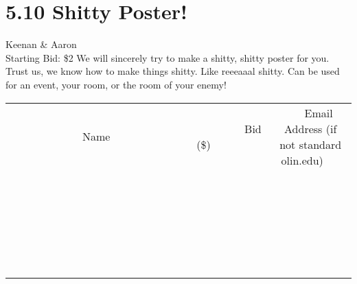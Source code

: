\documentclass[11pt]{article}
\begin{document}
\section*{5.10 Shitty Poster!}
Keenan \& Aaron
\\
Starting Bid: \$2
\newline
We will sincerely try to make a shitty, shitty poster for you. Trust us, we know how to make things shitty. Like reeeaaal shitty. Can be used for an event, your room, or the room of your enemy!
\\[6ex]
\begin{tabular}{c c c}
~~~~~~~~~~~~~Name~~~~~~~~~~~~~ & ~~~~~~~~~Bid (\$)~~~~~~~~~  & ~~~Email Address (if not standard olin.edu)~~~\\
 & & \\
\hline
 & & \\
\hline
 & & \\
\hline
 & & \\
\hline
 & & \\
\hline
 & & \\
\hline
 & & \\
\hline
 & & \\
\hline
 & & \\
\hline
 & & \\
\hline
 & & \\
\hline
 & & \\
\hline
 & & \\
\hline
 & & \\
\hline
 & & \\
\hline
 & & \\
\hline
 & & \\
\hline
 & & \\
\hline
 & & \\
\hline
 & & \\
\hline
 & & \\
\hline
 & & \\
\hline
 & & \\
\hline
 & & \\
\hline
 & & \\
\hline
 & & \\
\hline
\end{tabular}
\newpage
\end{document}
